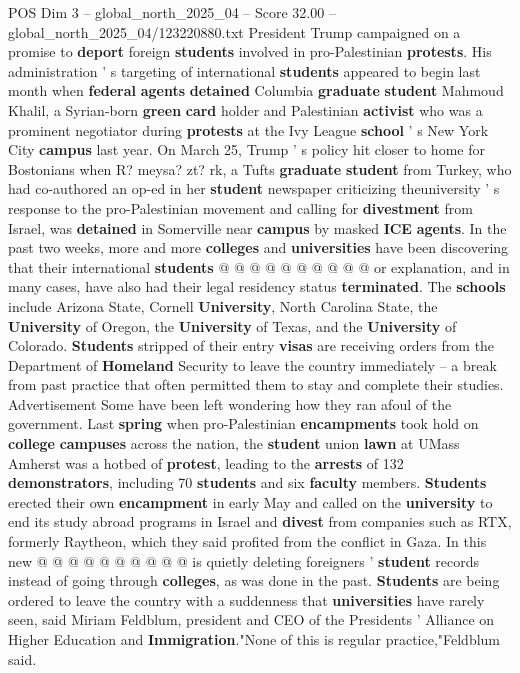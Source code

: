 \begin{textsample}{POS Dim 3 – global\_north\_2025\_04 – Score 32.00 – global\_north\_2025\_04/123220880.txt}
President Trump campaigned on a promise to \textbf{deport} foreign \textbf{students} involved in pro-Palestinian \textbf{protests}.
His administration ' s targeting of international \textbf{students} appeared to begin last month when \textbf{federal} \textbf{agents} \textbf{detained} Columbia \textbf{graduate} \textbf{student} Mahmoud Khalil, a Syrian-born \textbf{green} \textbf{card} holder and Palestinian \textbf{activist} who was a prominent negotiator during \textbf{protests} at the Ivy League \textbf{school} ' s New York City \textbf{campus} last year.
On March 25, Trump ' s policy hit closer to home for Bostonians when R? meysa? zt? rk, a Tufts \textbf{graduate} \textbf{student} from Turkey, who had co-authored an op-ed in her \textbf{student} newspaper criticizing theuniversity ' s response to the pro-Palestinian movement and calling for \textbf{divestment} from Israel, was \textbf{detained} in Somerville near \textbf{campus} by masked \textbf{ICE} \textbf{agents}.
In the past two weeks, more and more \textbf{colleges} and \textbf{universities} have been discovering that their international \textbf{students} @ @ @ @ @ @ @ @ @ @ or explanation, and in many cases, have also had their legal residency status \textbf{terminated}.
The \textbf{schools} include Arizona State, Cornell \textbf{University}, North Carolina State, the \textbf{University} of Oregon, the \textbf{University} of Texas, and the \textbf{University} of Colorado. \textbf{Students} stripped of their entry \textbf{visas} are receiving orders from the Department of \textbf{Homeland} Security to leave the country immediately -- a break from past practice that often permitted them to stay and complete their studies.
Advertisement Some have been left wondering how they ran afoul of the government.
Last \textbf{spring} when pro-Palestinian \textbf{encampments} took hold on \textbf{college} \textbf{campuses} across the nation, the \textbf{student} union \textbf{lawn} at UMass Amherst was a hotbed of \textbf{protest}, leading to the \textbf{arrests} of 132 \textbf{demonstrators}, including 70 \textbf{students} and six \textbf{faculty} members. \textbf{Students} erected their own \textbf{encampment} in early May and called on the \textbf{university} to end its study abroad programs in Israel and \textbf{divest} from companies such as RTX, formerly Raytheon, which they said profited from the conflict in Gaza.
In this new @ @ @ @ @ @ @ @ @ @ is quietly deleting foreigners ' \textbf{student} records instead of going through \textbf{colleges}, as was done in the past. \textbf{Students} are being ordered to leave the country with a suddenness that \textbf{universities} have rarely seen, said Miriam Feldblum, president and CEO of the Presidents ' Alliance on Higher Education and \textbf{Immigration}."None of this is regular practice,"Feldblum said.

\end{textsample}
